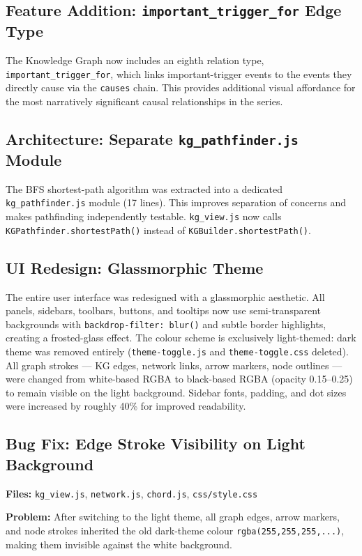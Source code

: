 \documentclass[11pt,a4paper]{article}
\begin{document}
\subsection{Feature Addition: \texttt{important\_trigger\_for} Edge Type}
The Knowledge Graph now includes an eighth relation type, \texttt{important\_trigger\_for}, which links important-trigger events to the events they directly cause via the \texttt{causes} chain. This provides additional visual affordance for the most narratively significant causal relationships in the series.

\subsection{Architecture: Separate \texttt{kg\_pathfinder.js} Module}
The BFS shortest-path algorithm was extracted into a dedicated \texttt{kg\_pathfinder.js} module (17 lines). This improves separation of concerns and makes pathfinding independently testable. \texttt{kg\_view.js} now calls \texttt{KGPathfinder.shortestPath()} instead of \texttt{KGBuilder.shortestPath()}.

\subsection{UI Redesign: Glassmorphic Theme}
The entire user interface was redesigned with a glassmorphic aesthetic. All panels, sidebars, toolbars, buttons, and tooltips now use semi-transparent backgrounds with \texttt{backdrop-filter: blur()} and subtle border highlights, creating a frosted-glass effect. The colour scheme is exclusively light-themed: dark theme was removed entirely (\texttt{theme-toggle.js} and \texttt{theme-toggle.css} deleted). All graph strokes --- KG edges, network links, arrow markers, node outlines --- were changed from white-based RGBA to black-based RGBA (opacity 0.15--0.25) to remain visible on the light background. Sidebar fonts, padding, and dot sizes were increased by roughly 40\% for improved readability.

\subsection{Bug Fix: Edge Stroke Visibility on Light Background}
\label{sec:lightfix}
\textbf{Files:} \texttt{kg\_view.js}, \texttt{network.js}, \texttt{chord.js}, \texttt{css/style.css}

\textbf{Problem:} After switching to the light theme, all graph edges, arrow markers, and node strokes inherited the old dark-theme colour \texttt{rgba(255,255,255,...)}, making them invisible against the white background.
\end{document}
